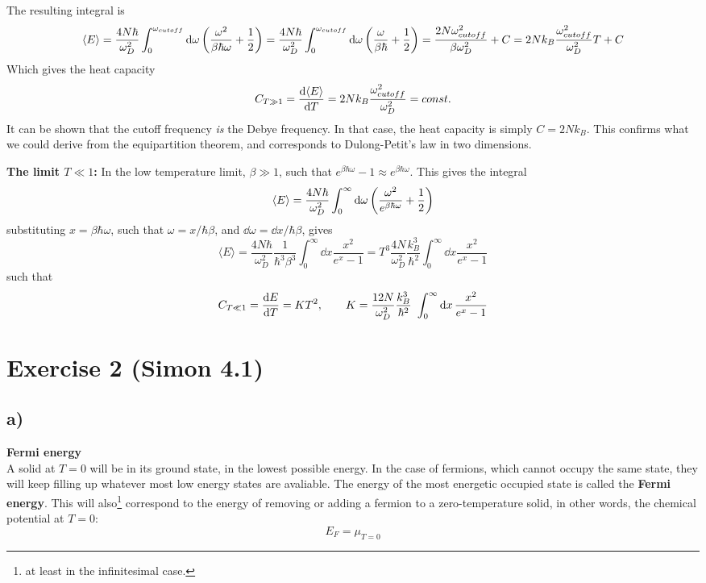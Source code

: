 \documentclass[12p,a4paper]{article}
\renewcommand{\exp}{e^}
\newcommand{\half}{\frac{1}{2}}
\renewcommand{\exp}{e^}
\begin{document}
The resulting integral is 
\[
    \langle E \rangle =  \frac{4N\hbar}{\omega_D^2} \int_0^{\omega_{cutoff}} \dd{\omega} \qty(\frac{\omega^2}{\beta\hbar\omega} + \half ) = \frac{4N\hbar}{\omega_D^2} \int_0^{\omega_{cutoff}} \dd{\omega} \qty(\frac{\omega}{\beta\hbar} + \half ) =  \frac{2N\omega_{cutoff}^2}{\beta\omega_D^2} + C = 2Nk_B\frac{\omega_{cutoff}^2}{\omega_D^2}T + C
\]
Which gives the heat capacity
\[
    C_{T \gg 1} = \dv{\langle E \rangle}{T} = 2Nk_B\frac{\omega_{cutoff}^2}{\omega_D^2} = const.
\]
It can be shown that the cutoff frequency \textit{is} the Debye frequency. In that case, the heat capacity is simply $C = 2Nk_B$. This confirms what we could derive from the equipartition theorem, and corresponds to Dulong-Petit's law in two dimensions.



\textbf{The limit $T \ll 1$:}
In the low temperature limit, $\beta \gg 1$, such that $\exp{\beta\hbar\omega} - 1 \approx \exp{\beta\hbar\omega}$. This gives the integral
\[
    \langle E \rangle = \frac{4N\hbar}{\omega_D^2} \int_0^{\infty} \dd{\omega} \qty(\frac{\omega^2}{\exp{\beta\hbar\omega}} + \half )
\]
substituting $x = \beta\hbar\omega$, such that $\omega = x/\hbar\beta$, and $\dd{\omega} = \dd{x}/\hbar\beta$, gives
\[
    \langle E \rangle = \frac{4N\hbar}{\omega_D^2} \frac{1}{\hbar^3\beta^3} \int_0^\infty\dd{x} \frac{x^2}{\exp{x} - 1} = T^3 \frac{4N}{\omega_D^2} \frac{k_B^3}{\hbar^2} \int_0^\infty\dd{x} \frac{x^2}{\exp{x} - 1}
\]
such that
\[
    C_{T \ll 1} = \dv{E}{T} = KT^2, \quad\quad K = \frac{12N}{\omega_D^2} \frac{k_B^3}{\hbar^2} \int_0^\infty\dd{x} \frac{x^2}{\exp{x} - 1}
\]

\section*{Exercise 2 (Simon 4.1)}
\subsection*{a)}
\textbf{Fermi energy}\\
A solid at $T = 0$ will be in its ground state, in the lowest possible energy. In the case of fermions, which cannot occupy the same state, they will keep filling up whatever most low energy states are avaliable. The energy of the most energetic occupied state is called the \textbf{Fermi energy}. This will also\footnote{at least in the infinitesimal case.} correspond to the energy of removing or adding a fermion to a zero-temperature solid, in other words, the chemical potential at $T=0$:
\[
    E_F = \mu_{T=0}
\]
\end{document}
